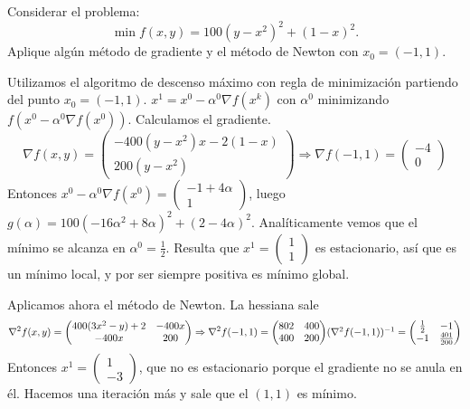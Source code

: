 \documentclass[twoside]{article}
\begin{document}
\newpage

\begin{ejercicio}{4}
Considerar el problema:
$$\min f(x,y)=100(y-x^2)^2+(1-x)^2.$$
Aplique algún método de gradiente y el método de Newton con $x_0=(-1,1)$.
\end{ejercicio}
\begin{solucion}
Utilizamos el algoritmo de descenso máximo con regla de minimización partiendo del punto $x_0=(-1,1)$. $x^1=x^0-\alpha^0\nabla f(x^k)$ con $\alpha^0$ minimizando $f(x^0-\alpha^0\nabla f(x^0))$. Calculamos el gradiente. 
\[
\nabla f(x,y)=\begin{pmatrix}
-400(y-x^2)x-2(1-x)\\
200(y-x^2)
\end{pmatrix}\Rightarrow\nabla f(-1,1)=\begin{pmatrix}
-4\\
0
\end{pmatrix}
\]
Entonces $x^0-\alpha^0\nabla f(x^0)=\begin{pmatrix}
-1+4\alpha\\
1
\end{pmatrix}$, luego $g(\alpha)=100(-16\alpha^2+8\alpha)^2+(2-4\alpha)^2$. Analíticamente vemos que el mínimo se alcanza en $\alpha^0=\frac{1}{2}$. Resulta que $x^1 = \begin{pmatrix}
1\\
1
\end{pmatrix}$ es estacionario, así que es un mínimo local, y por ser siempre positiva es mínimo global.


Aplicamos ahora el método de Newton. La hessiana sale
\[
\nabla^2 f(x,y)=\begin{pmatrix}
400(3x^2-y)+2 & -400x\\
-400x & 200
\end{pmatrix}\Rightarrow\nabla^2f(-1,1)=\begin{pmatrix}
802 & 400\\
400 & 200
\end{pmatrix}$$
$$(\nabla^2f(-1,1))^{-1}=\begin{pmatrix}
\frac{1}{2} & -1\\
-1 &\frac{401}{200}
\end{pmatrix}
\]
Entonces $x^1=\begin{pmatrix}
1\\
-3
\end{pmatrix}$, que no es estacionario porque el gradiente no se anula en él. Hacemos una iteración más y sale que el $(1,1)$ es mínimo.
\end{solucion}
\end{document}
